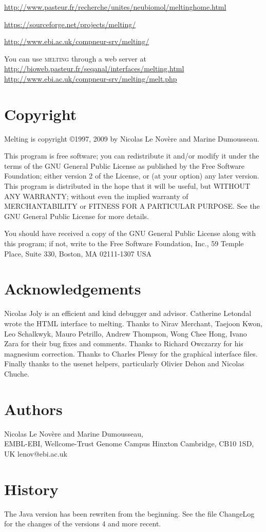 \documentclass{article}
\begin{document}
\url{http://www.pasteur.fr/recherche/unites/neubiomol/meltinghome.html} 

\url{https://sourceforge.net/projects/melting/}

\url{http://www.ebi.ac.uk/compneur-srv/melting/}
  
You can use \textsc{melting} through a web server at 
\url{http://bioweb.pasteur.fr/seqanal/interfaces/melting.html}
\url{http://www.ebi.ac.uk/compneur-srv/melting/melt.php}   
   
\section{Copyright }
Melting is copyright 
\copyright 1997, 2009 by Nicolas Le Nov\`ere and Marine Dumousseau.  

This program is free software; 
you can redistribute it and/or modify it under the terms of the GNU General 
Public License as published by the Free Software Foundation; either version 
2 of the License, or (at your option) any later version.   
  This program 
is distributed in the hope that it will be useful, but WITHOUT ANY WARRANTY; 
without even the implied warranty of MERCHANTABILITY or FITNESS FOR A 
PARTICULAR PURPOSE.  See the GNU General Public License for more details. 
  
  You should have received a copy of the GNU General Public License 
along with this program; if not, write to the Free Software Foundation, 
Inc., 59 Temple Place, Suite 330, Boston, MA  02111-1307 USA   
   
\section{Acknowledgements}
Nicolas Joly is an efficient and kind debugger and advisor.  Catherine
Letondal wrote the HTML interface to melting. Thanks to Nirav Merchant,
Taejoon Kwon, Leo Schalkwyk, Mauro Petrillo, Andrew Thompson, Wong Chee Hong, Ivano
Zara for their bug fixes and comments. Thanks to Richard Owczarzy for his magnesium 
correction. Thanks to Charles Plessy for the graphical interface files. Finally thanks
to the usenet helpers, particularly Olivier Dehon and Nicolas Chuche.

   
\section{Authors }
Nicolas Le Nov\`ere and Marine Dumousseau, \\
EMBL-EBI, 
Wellcome-Trust Genome Campus
Hinxton Cambridge, CB10 1SD, UK
lenov@ebi.ac.uk
  
\section{History }

The Java version has been rewriten from the beginning.
See the file ChangeLog for the changes of the versions 4 and more recent.
\end{document}
